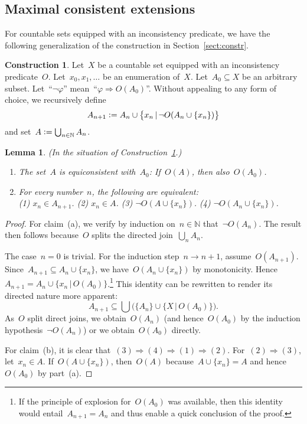 \documentclass[com,11pt,crcready]{iosart2x}
\theoremstyle{definition}
\newtheorem{construction}{Construction}[section]
\theoremstyle{plain}
\newtheorem{lemma}[definition]{Lemma}
\theoremstyle{remark}
\newcommand{\NN}{\mathbb{N}}
\newcommand{\defeq}{\vcentcolon=}
\renewcommand{\_}{\mathpunct{.}\,}
\begin{document}
\subsection{Maximal consistent extensions}

For countable sets equipped with an inconsistency predicate, we have the
following generalization of the construction in Section~\ref{sect:constr}.

\begin{construction}\label{constr:inc}Let~$X$ be a countable set equipped with
an inconsistency predicate~$O$. Let~$x_0,x_1,\ldots$ be an enumeration of~$X$.
Let~$A_0 \subseteq X$ be an arbitrary subset. Let~``$\neg\varphi$''
mean~``$\varphi \Rightarrow O(A_0)$''. Without appealing to any form of choice,
we recursively define
\[ A_{n+1} \defeq A_n \cup \bigl\{ x_n \,|\, \neg O(A_n\cup\{x_n\}) \bigr\} \]
and set~$A \defeq \bigcup_{n \in \NN} A_n$.
\end{construction}

\begin{lemma}\label{lemma:omnibus-inc}(In the situation of
Construction~\ref{constr:inc}.)
\begin{enumerate}
\item[(a)] The set~$A$ is equiconsistent with~$A_0$: If~$O(A)$, then also~$O(A_0)$.
\item[(b)] For every number~$n$, the following are equivalent: \\
(1) $x_n \in A_{n+1}$. \quad
(2) $x_n \in A$. \quad
(3) $\neg O(A\cup\{x_n\})$. \quad
(4) $\neg O(A_n \cup \{x_n\})$.
\end{enumerate}\end{lemma}

\begin{proof}For claim~(a), we verify by induction on~$n \in \NN$ that~$\neg
O(A_n)$. The result then follows because~$O$ splits the directed join~$\bigcup_n A_n$.

The case~$n = 0$ is trivial. For the induction step~$n \to n+1$,
assume~$O(A_{n+1})$. Since~$A_{n+1} \subseteq A_n \cup \{x_n\}$, we have~$O(A_n
\cup \{ x_n \})$ by monotonicity. Hence~$A_{n+1} = A_n \cup \{ x_n \,|\, O(A_0)
\}$.\footnote{If the principle of explosion for~$O(A_0)$ was available, then
this identity would entail~$A_{n+1} = A_n$ and thus enable a quick conclusion
of the proof.} This identity can be rewritten to render its directed nature
more apparent:
\[ A_{n+1} \subseteq \bigcup \bigl(\{A_n\} \cup \{X \,|\, O(A_0)\}\bigr). \]
As~$O$ split direct joins, we obtain~$O(A_n)$ (and hence~$O(A_0)$ by the
induction hypothesis~$\neg O(A_n)$) or we obtain~$O(A_0)$ directly.

For claim~(b), it is clear that~$(3) \Rightarrow (4) \Rightarrow (1) \Rightarrow
(2)$. For~$(2) \Rightarrow (3)$, let~$x_n \in A$.
If~$O(A\cup\{x_n\})$, then~$O(A)$ because~$A\cup\{x_n\}=A$ and hence~$O(A_0)$
by part~(a).
\end{proof}
\end{document}
